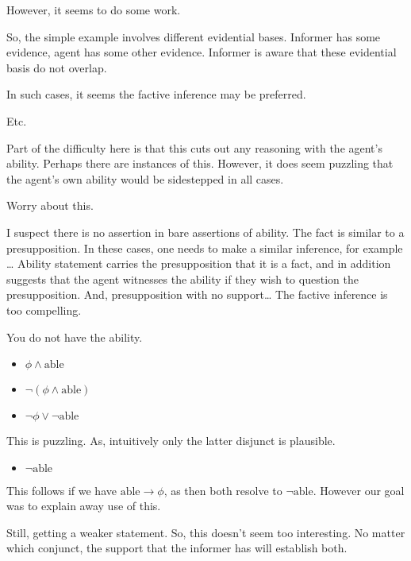 \documentclass[10pt]{article}
\begin{document}
\begin{note}[Embedded]
\begin{note}
    However, it seems to do some work.

    So, the simple example involves different evidential bases.
    Informer has some evidence, agent has some other evidence.
    Informer is aware that these evidential basis do not overlap.

    In such cases, it seems the factive inference may be preferred.

    Etc.\

  \end{note}

  Part of the difficulty here is that this cuts out any reasoning with the agent's ability.
  Perhaps there are instances of this.
  However, it does seem puzzling that the agent's own ability would be sidestepped in all cases.

  Worry about this.

  I suspect there is no assertion in bare assertions of ability.
  The fact is similar to a presupposition.
  In these cases, one needs to make a similar inference, for example \dots
  Ability statement carries the presupposition that it is a fact, and in addition suggests that the agent witnesses the ability if they wish to question the presupposition.
  And, presupposition with no support\dots
  The factive inference is too compelling.

  \begin{note}[Negation]
    You do not have the ability.

    \begin{itemize}
    \item \(\phi \land \text{able}\)
    \item \(\lnot(\phi \land \text{able})\)
    \item \(\lnot\phi \lor \lnot\text{able}\)
    \end{itemize}
    This is puzzling.
    As, intuitively only the latter disjunct is plausible.
    \begin{itemize}
    \item \(\lnot\text{able}\)
    \end{itemize}
    This follows if we have \(\text{able} \rightarrow \phi\), as then both resolve to \(\lnot\text{able}\).
    However our goal was to explain away use of this.

    Still, getting a weaker statement.
    So, this doesn't seem too interesting.
    No matter which conjunct, the support that the informer has will establish both.
  \end{note}


\end{note}
\end{document}
